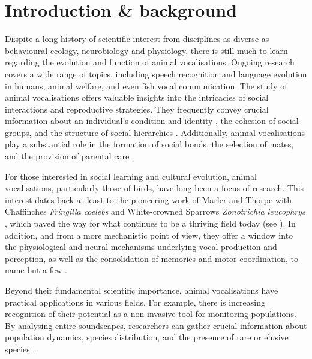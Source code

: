 \section{Introduction \& background}
\lettrine[lines=2]Despite a long history of scientific interest from disciplines as diverse as behavioural ecology, neurobiology and physiology, there is still much to learn regarding the evolution and function of animal vocalisations. Ongoing research covers a wide range of topics, including speech recognition and language evolution in humans, animal welfare, and even fish vocal communication. The study of animal vocalisations offers valuable insights into the intricacies of social interactions and reproductive strategies. They frequently convey crucial information about an individual's condition and identity \parencite{lehmann2017, linhart2019}, the cohesion of social groups, and the structure of social hierarchies \parencite{bell2010, engesser2022, radford2007}. Additionally, animal vocalisations play a substantial role in the formation of social bonds, the selection of mates, and the provision of parental care \parencite{behr2004, gerhardt1991, pitcher2010, roulin2001}.

For those interested in social learning and cultural evolution, animal vocalisations, particularly those of birds, have long been a focus of research. This interest dates back at least to the pioneering work of Marler and Thorpe with Chaffinches \textit{Fringilla coelebs} and White-crowned Sparrows \textit{Zonotrichia leucophrys} \parencite{marler1964, Marler1962, marler1952, thorpe1958}, which paved the way for what continues to be a thriving field today (see \cite{mets2019, riebel2015, williams2021, youngblood2022}). In addition, and from a more mechanistic point of view, they offer a window into the physiological and neural mechanisms underlying vocal production and perception, as well as the consolidation of memories and motor coordination, to name but a few \parencite{davenport2023}. 

Beyond their fundamental scientific importance, animal vocalisations have practical applications in various fields. For example, there is increasing recognition of their potential as a non-invasive tool for monitoring populations. By analysing entire soundscapes, researchers can gather crucial information about population dynamics, species distribution, and the presence of rare or elusive species \parencite{kahl2021, sethi2020, sugai2019}.

